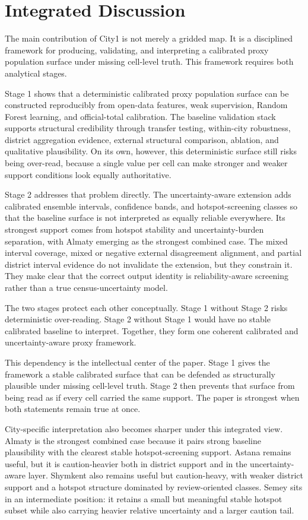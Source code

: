 \section{Integrated Discussion}

The main contribution of City1 is not merely a gridded map. It is a disciplined framework for producing, validating, and interpreting a calibrated proxy population surface under missing cell-level truth. This framework requires both analytical stages.

Stage 1 shows that a deterministic calibrated proxy population surface can be constructed reproducibly from open-data features, weak supervision, Random Forest learning, and official-total calibration. The baseline validation stack supports structural credibility through transfer testing, within-city robustness, district aggregation evidence, external structural comparison, ablation, and qualitative plausibility. On its own, however, this deterministic surface still risks being over-read, because a single value per cell can make stronger and weaker support conditions look equally authoritative.

Stage 2 addresses that problem directly. The uncertainty-aware extension adds calibrated ensemble intervals, confidence bands, and hotspot-screening classes so that the baseline surface is not interpreted as equally reliable everywhere. Its strongest support comes from hotspot stability and uncertainty-burden separation, with Almaty emerging as the strongest combined case. The mixed interval coverage, mixed or negative external disagreement alignment, and partial district interval evidence do not invalidate the extension, but they constrain it. They make clear that the correct output identity is reliability-aware screening rather than a true census-uncertainty model.

The two stages protect each other conceptually. Stage 1 without Stage 2 risks deterministic over-reading. Stage 2 without Stage 1 would have no stable calibrated baseline to interpret. Together, they form one coherent calibrated and uncertainty-aware proxy framework.

This dependency is the intellectual center of the paper. Stage 1 gives the framework a stable calibrated surface that can be defended as structurally plausible under missing cell-level truth. Stage 2 then prevents that surface from being read as if every cell carried the same support. The paper is strongest when both statements remain true at once.

City-specific interpretation also becomes sharper under this integrated view. Almaty is the strongest combined case because it pairs strong baseline plausibility with the clearest stable hotspot-screening support. Astana remains useful, but it is caution-heavier both in district support and in the uncertainty-aware layer. Shymkent also remains useful but caution-heavy, with weaker district support and a hotspot structure dominated by review-oriented classes. Semey sits in an intermediate position: it retains a small but meaningful stable hotspot subset while also carrying heavier relative uncertainty and a larger caution tail.

